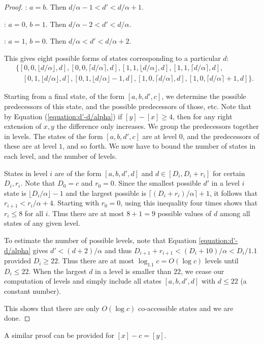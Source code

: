 \documentclass[12pt,reqno]{article}
\begin{document}
\begin{proof}
\medskip

:  $a=b$.
Then $d/\alpha -1 < d'  < d/\alpha + 1$.

\medskip

:  $a = 0$, $b = 1$.   Then $d/\alpha -2 < d'  < d/\alpha$.

\medskip

:  $a = 1$, $b = 0$.  Then $d/\alpha < d'  < d/\alpha +2$.

\medskip

This gives eight possible forms of states corresponding to a particular $d$:
\begin{align*}
   & \{ [0,0,\lfloor d/\alpha \rfloor,d],
[0,0, \lceil d/\alpha \rceil,d],
[1,1,\lfloor d/\alpha \rfloor,d],
[1,1,\lceil d/\alpha \rceil,d],\\
& \quad [0,1,\lfloor d/\alpha \rfloor, d],
[0,1, \lfloor d/\alpha \rfloor -1, d],
[1,0, \lceil d/\alpha \rceil, d],
[1,0, \lceil d/\alpha \rceil + 1, d] \}.
\end{align*}

Starting from a final state, of the form $[a,b,d',c]$, we determine the possible predecessors of this state, and the possible predecessors of those, etc.  Note that by Equation (\ref{equation:d'-d/alpha}) if $[y]-[x] \geq 4$, then for any right extension of $x, y$ the difference only increases.  We group the predecessors together in levels.  The states of the form $[a,b,d',c]$ are at level $0$, and the predecessors of these are at level $1$, and so forth.
We now have to bound the number of states in each level, and the number of levels. 

States in level $i$ are of the form $[a,b,d',d]$ and
$d \in [D_i, D_i + r_i]$ for certain $D_i, r_i$.  Note that $D_0 = c$ and $r_0 = 0$.  Since the smallest possible $d'$ in a level $i$ state is $\lfloor D_i/\alpha \rfloor - 1$ and the largest possible is $\lceil (D_i +r_i)/\alpha \rceil + 1$, it follows that
$r_{i+1} < r_i/\alpha + 4$.  Starting with $r_0 = 0$, using this inequality four times shows that $r_i \leq 8$ for all $i$. Thus there are at most $8+1 = 9$ possible values of $d$ among all states of any given level.

To estimate the number of possible levels, note that Equation \eqref{equation:d'-d/alpha} gives $d' < (d+2)/\alpha$ and thus
$D_{i+1} + r_{i+1} < (D_i+10)/\alpha < D_i/1.1$
provided $D_i \geq 22$.  Thus
there are at most $\log_{1.1} c = O(\log c)$ levels until $D_i \leq 22$.
When the largest $d$ in a level is smaller than $22$, we cease our computation of levels and simply include all states $[a,b,d',d]$
with $d \leq 22$ (a constant number).

This shows that there are only $O(\log c)$ co-accessible states and we are done.
\end{proof}
A similar proof can be provided for $[x]-c = [y]$.
\end{document}
